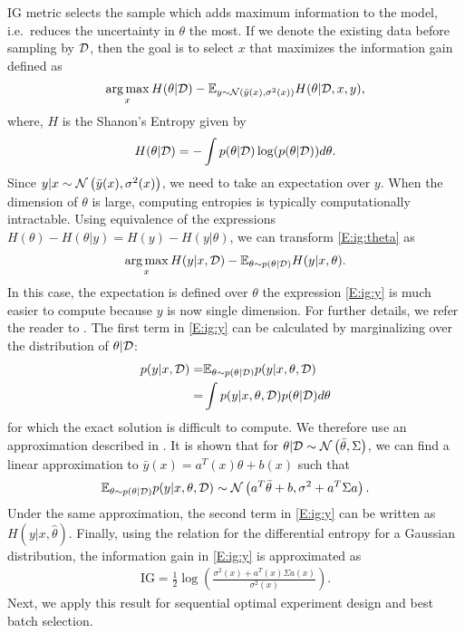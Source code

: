 IG metric selects the sample which adds maximum information to the model, i.e.~reduces the uncertainty in \(\theta\) the most. If we denote the existing data before sampling by \(\mathcal{D}\), then the goal is to select \(x\) that maximizes the information gain defined as
\begin{align}
\argmax_x H(\theta|\D) - \EE_{y \sim \GaussianDist{\bar{y}(x)}{\sigma^2(x)}}H(\theta|\D,x,y),
\label{E:ig:theta}
\end{align}
where, \(H\) is the Shanon's Entropy given by
\begin{align}
H(\theta|\mathcal{D}) = -\int p(\theta|\mathcal{D}) \log (p(\theta|\mathcal{D}))d\theta.
\end{align}
Since \(y|x \sim \operatorname*{\mathcal{N}}\left(\bar{y}(x), \sigma^2(x)\right)\), we need to take an expectation over \(y\). When the dimension of \(\theta\) is large, computing entropies is typically computationally intractable. Using equivalence of the expressions \(H(\theta) - H(\theta|y) = H(y) - H(y|\theta)\),
we can transform \eqref{E:ig:theta} as
\begin{align}
\argmax_x H(y|x,\D) - \EE_{\theta \sim p(\theta|\D)}H(y|x,\theta).
\label{E:ig:y}
\end{align}
In this case, the expectation is defined over \(\theta\) the expression \eqref{E:ig:y} is much easier to compute because \(y\) is now single dimension. For further details, we refer the reader to \cite{Houlsby2011}.
The first term in \eqref{E:ig:y} can be calculated by marginalizing over the distribution of \(\theta|\mathcal{D}\):
\begin{align}
p(y|x,\mathcal{D}) =& \mathbb{E}_{\theta \sim p(\theta|\mathcal{D})}p(y|x,\theta,\mathcal{D}) \nonumber\\
=& \int p(y|x,\theta, \mathcal{D})p(\theta|\mathcal{D})d\theta
\end{align}
for which the exact solution is difficult to compute. We therefore use an approximation described in \cite{Garnett2013}. It is shown that for \(\theta|\mathcal{D} \sim \operatorname*{\mathcal{N}}\left(\bar{\theta}, \Sigma\right)\), we can find a linear approximation to \(\bar{y}(x) = a^T(x)\theta+b(x)\) such that
\begin{align}
\mathbb{E}_{\theta \sim p(\theta|\mathcal{D})}p(y|x,\theta,\mathcal{D}) \sim \operatorname*{\mathcal{N}}\left(a^T\bar{\theta}+b, \sigma^2+a^T\Sigma a\right).
\end{align}
Under the same approximation, the second term in \eqref{E:ig:y} can be written as \(H(y|x,\hat{\theta})\). 
Finally, using the relation for the differential entropy for a Gaussian distribution, the information gain in \eqref{E:ig:y} is approximated as
\begin{align}
\text{IG} = \frac{1}{2}\log\left(\frac{\sigma^2(x)+a^T(x)\Sigma a(x)}{\sigma^2(x)}\right).
\label{E:ig:final}
\end{align}
Next, we apply this result for sequential optimal experiment design and best batch selection.


